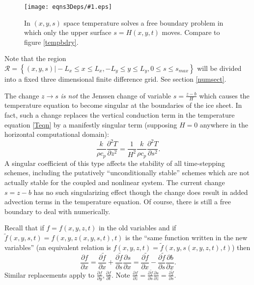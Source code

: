\documentclass[12pt,final]{amsart}%
\theoremstyle{plain}
\theoremstyle{definition}
\theoremstyle{remark}
\newcommand{\regfigure}[2]{\texttt{[image: eqns3Deps/\#1.eps]}}
\newcommand{\ddt}[1]{\ensuremath{\frac{\partial #1}{\partial t}}}
\newcommand{\ddx}[1]{\ensuremath{\frac{\partial #1}{\partial x}}}
\newcommand{\ddy}[1]{\ensuremath{\frac{\partial #1}{\partial y}}}
\newcommand{\ddz}[1]{\ensuremath{\frac{\partial #1}{\partial z}}}
\newcommand{\dds}[1]{\ensuremath{\frac{\partial #1}{\partial s}}}
\begin{document}
\begin{figure}[ht]
\vspace{-2mm}
\regfigure{stempbdryfig}{3}
\vspace{-4mm}
\caption{In $(x,y,s)$ space temperature solves a free boundary problem in which only the upper surface $s=H(x,y,t)$ moves.  Compare to figure \ref{tempbdry}.}
\label{stempbdry}
\end{figure}

Note that the region $\mathcal{R}=\left\{(x,y,s)\big| -L_x\le x \le L_x, -L_y\le y \le L_y, 0\le s \le s_{max}\right\}$ will be divided into a fixed three dimensional finite difference grid.  See section \ref{numsect}.

The change $z\to s$ \emph{is not} the Jenssen \citep{Jenssen} change of variable $s=\frac{z-b}{H}$ which causes the temperature equation to become singular at the boundaries of the ice sheet.  In fact, such a change replaces the vertical conduction term in the temperature equation \eqref{Teqn} by a manifestly singular term (supposing $H=0$ anywhere in the horizontal computational domain):
    $$\frac{k}{\rho c_p} \frac{\partial^2 T}{\partial z^2} = \frac{1}{H^2} \frac{k}{\rho c_p} \frac{\partial^2 T}{\partial s^2}.$$
A singular coefficient of this type affects the stability of all time-stepping schemes, including the putatively ``unconditionally stable'' schemes which are not actually stable for the coupled and nonlinear system.  The current change $s=z-b$ has no such singularizing effect though the change does result in added advection terms in the temperature equation.  Of course, there is still a free boundary to deal with numerically.

Recall that if $f=f(x,y,z,t)$ in the old variables and if $\tilde f(x,y,s,t)=f(x,y,z(x,y,s,t),t)$ is the ``same function written in the new variables'' (an equivalent relation is $f(x,y,z,t)=\tilde f(x,y,s(x,y,z,t),t)$) then
    $$\ddx{f} = \ddx{\tilde f}+\dds{\tilde f}\ddx{s} = \ddx{\tilde f}-\dds{\tilde f}\ddx{b}.$$
Similar replacements apply to $\ddy{f},\ddt{f}$. Note $\ddz{f}=\dds{\tilde f} \ddz{s} = \dds{\tilde f}$.
\end{document}

